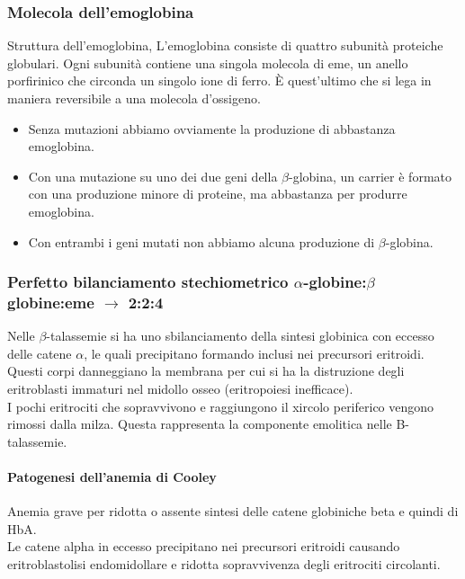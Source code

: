 \documentclass{article}
\begin{document}
\subsubsection*{Molecola dell'emoglobina}
Struttura dell'emoglobina, L'emoglobina consiste di quattro subunità proteiche globulari. Ogni subunità contiene una singola molecola di eme, un anello porfirinico che
circonda un singolo ione di ferro. È quest'ultimo che si lega in maniera reversibile a una molecola d'ossigeno.
\begin{itemize}
    \item[ ] Senza mutazioni abbiamo ovviamente la produzione di abbastanza emoglobina.
    \item[ ] Con una mutazione su uno dei due geni della $\beta$-globina, un carrier è formato con una produzione minore di proteine, ma abbastanza per produrre emoglobina.
    \item[ ] Con entrambi i geni mutati non abbiamo alcuna produzione di $\beta$-globina.
\end{itemize}
\subsubsection*{Perfetto bilanciamento stechiometrico $\alpha$-globine:$\beta$globine:eme $\rightarrow$ 2:2:4}
Nelle $\beta$-talassemie si ha uno sbilanciamento della sintesi globinica con eccesso delle catene $\alpha$, le quali precipitano formando inclusi nei precursori eritroidi.
Questi corpi danneggiano la membrana per cui si ha la distruzione degli eritroblasti immaturi nel midollo osseo (eritropoiesi inefficace).\\
I pochi eritrociti che sopravvivono e raggiungono il xircolo periferico vengono rimossi dalla milza. Questa rappresenta la componente emolitica nelle B-talassemie.

\paragraph{Patogenesi dell'anemia di Cooley}
Anemia grave per ridotta o assente sintesi delle catene globiniche beta e quindi di HbA.\\
Le catene alpha in eccesso precipitano nei precursori eritroidi causando eritroblastolisi endomidollare e ridotta sopravvivenza degli eritrociti circolanti.
\end{document}

